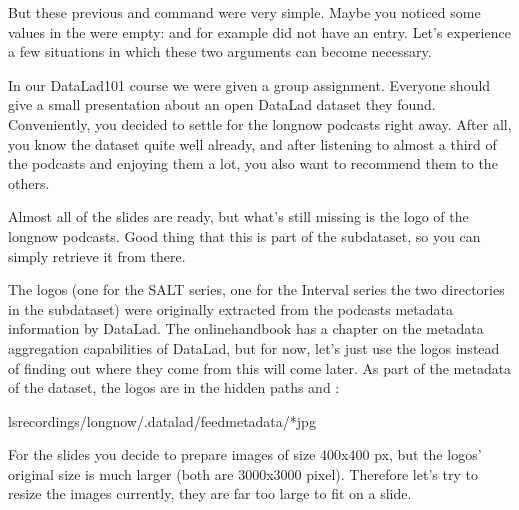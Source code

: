 \sphinxAtStartPar
But these previous  and  command were very simple.
Maybe you noticed some values in the  were empty:
 and  for example did not have an entry. Let’s experience
a few situations in which
these two arguments can become necessary.

\sphinxAtStartPar
In our DataLad\sphinxhyphen{}101 course we were given a group assignment. Everyone should
give a small presentation about an open DataLad dataset they found. Conveniently,
you decided to settle for the longnow podcasts right away.
After all, you know the dataset quite well already,
and after listening to almost a third of the podcasts
and enjoying them a lot,
you also want to recommend them to the others.

\sphinxAtStartPar
Almost all of the slides are ready, but what’s still missing is the logo of the
longnow podcasts. Good thing that this is part of the subdataset,
so you can simply retrieve it from there.

\sphinxAtStartPar
The logos (one for the SALT series, one for the Interval series \textendash{} the two
directories in the subdataset)
were originally extracted from the podcasts metadata information by DataLad.
The online\sphinxhyphen{}handbook has a chapter on the metadata aggregation capabilities of DataLad,
but for now, let’s just use the logos instead of finding out where they
come from \textendash{} this will come later.
As part of the metadata of the dataset, the logos are
in the hidden paths
 and
:

\begin{sphinxVerbatim}[commandchars=\\\{\}]
lsrecordings/longnow/.datalad/feed\PYGZus{}metadata/*jpg
\end{sphinxVerbatim}

\sphinxAtStartPar
For the slides you decide to prepare images of size 400x400 px, but
the logos’ original size is much larger (both are 3000x3000 pixel). Therefore
let’s try to resize the images \textendash{} currently, they are far too large to fit on a slide.

